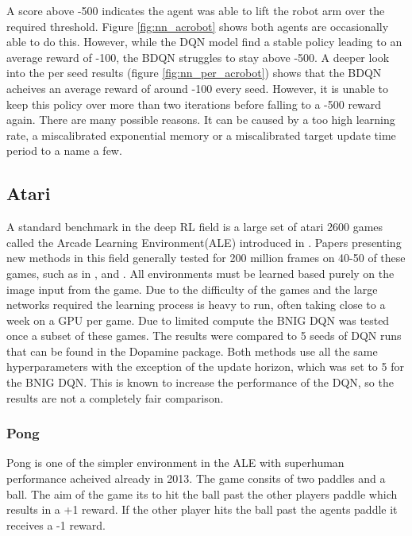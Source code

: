 A score above -500 indicates the agent was able to lift the robot arm over the required threshold. Figure \ref{fig:nn_acrobot} shows both agents are occasionally able to do this. However, while the DQN model find a stable policy leading to an average reward of -100, the BDQN struggles to stay above -500. A deeper look into the per seed results (figure \ref{fig:nn_per_acrobot}) shows that the BDQN acheives an average reward of around -100 every seed. However, it is unable to keep this policy over more than two iterations before falling to a -500 reward again. There are many possible reasons. It can be caused by a too high learning rate, a miscalibrated exponential memory or a miscalibrated target update time period to a name a few.

\subsection{Atari}

A standard benchmark in the deep RL field is a large set of atari 2600 games called the Arcade Learning Environment(ALE) introduced in \cite{bellemare_13}. Papers presenting new methods in this field generally tested for 200 million frames on 40-50 of these games, such as in \cite{mnih_2015}, \cite{mnih_2016} and \cite{donoghue_2017}. All environments must be learned based purely on the image input from the game. Due to the difficulty of the games and the large networks required the learning process is heavy to run, often taking close to a week on a GPU per game. Due to limited compute the BNIG DQN was tested once a subset of these games. The results were compared to 5 seeds of DQN runs that can be found in the Dopamine package. Both methods use all the same hyperparameters with the exception of the update horizon, which was set to 5 for the BNIG DQN. This is known to increase the performance of the DQN, so the results are not a completely fair comparison.

\subsubsection{Pong}

Pong is one of the simpler environment in the ALE with superhuman performance acheived already in 2013\citep{mnih_2013}. The game consits of two paddles and a ball. The aim of the game its to hit the ball past the other players paddle which results in a +1 reward. If the other player hits the ball past the agents paddle it receives a -1 reward. 

